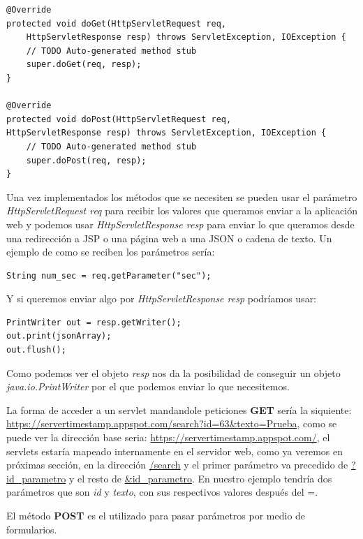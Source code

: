 \begin{lstlisting}[style=Java] 
@Override
protected void doGet(HttpServletRequest req, 
	HttpServletResponse resp) throws ServletException, IOException {
	// TODO Auto-generated method stub
	super.doGet(req, resp);
}

@Override
protected void doPost(HttpServletRequest req, 
HttpServletResponse resp) throws ServletException, IOException {
	// TODO Auto-generated method stub
	super.doPost(req, resp);
}
\end{lstlisting}


Una vez implementados los métodos que se necesiten se pueden usar el parámetro \textit{HttpServletRequest req} para recibir los valores que queramos enviar a la aplicación web y podemos usar \textit{HttpServletResponse resp} para enviar lo que queramos desde una redirección a JSP o una página web a una JSON o cadena de texto. 
Un ejemplo de como se reciben los parámetros sería: 

\begin{lstlisting}[style=Java]  
String num_sec = req.getParameter("sec");
\end{lstlisting}

Y si queremos enviar algo por \textit{HttpServletResponse resp} podríamos usar:

\begin{lstlisting}[style=Java]   
PrintWriter out = resp.getWriter();
out.print(jsonArray);
out.flush();
\end{lstlisting}

Como podemos ver el objeto \textit{resp} nos da la posibilidad de conseguir un objeto \textit{java.io.PrintWriter} por el que podemos enviar lo que necesitemos.

La forma de acceder a un servlet mandandole peticiones \textbf{GET} sería la siquiente: \url{https://servertimestamp.appspot.com/search?id=63&texto=Prueba}, como se puede ver la dirección base seria: \url{https://servertimestamp.appspot.com/}, el servlets estaría mapeado internamente en el servidor web, como ya veremos en próximas sección, en la dirección \url{/search} y el primer parámetro va precedido de \url{?id\_parametro} y el resto de \url{\&id\_parametro}. En nuestro ejemplo tendría dos parámetros que son \textit{id} y \textit{texto}, con sus respectivos valores después del =.

El método \textbf{POST} es el utilizado para pasar parámetros por medio de formularios.

